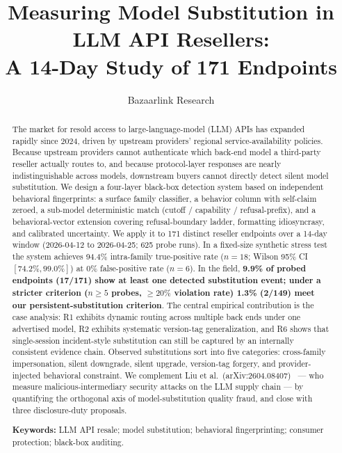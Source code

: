 \documentclass[10pt,a4paper,twocolumn]{article}
\title{Measuring Model Substitution in LLM API Resellers:\\
  A 14-Day Study of 171 Endpoints}
\author[1]{Bazaarlink Research}
\affil[1]{\texttt{bazaarlink.ai} --- corresponding repository:\\
  \href{https://github.com/Bazaarlinkorg/LLMprobe-engine}{github.com/Bazaarlinkorg/LLMprobe-engine}}
\date{}
\begin{document}
\maketitle

\begin{abstract}
The market for resold access to large-language-model (LLM) APIs has expanded
rapidly since 2024, driven by upstream providers' regional service-availability
policies. Because upstream providers cannot authenticate which back-end model a
third-party reseller actually routes to, and because protocol-layer responses
are nearly indistinguishable across models, downstream buyers cannot directly
detect silent model substitution. We design a four-layer black-box detection
system based on independent behavioral fingerprints: a surface family
classifier, a behavior column with self-claim zeroed, a sub-model deterministic
match (cutoff / capability / refusal-prefix), and a behavioral-vector extension
covering refusal-boundary ladder, formatting idiosyncrasy, and calibrated
uncertainty. We apply it to 171 distinct reseller endpoints over a 14-day
window (2026-04-12 to 2026-04-25; 625 probe runs). In a fixed-size
synthetic stress test the system achieves 94.4\% intra-family true-positive
rate ($n{=}18$; Wilson 95\% CI $[74.2\%, 99.0\%]$) at 0\% false-positive rate
($n{=}6$). In the field, \textbf{9.9\% of probed endpoints (17/171) show at
least one detected substitution event; under a stricter criterion ($n{\geq}5$
probes, ${\geq}20\%$ violation rate) 1.3\% (2/149) meet our
persistent-substitution criterion}. The central empirical contribution is the
case analysis: R1 exhibits dynamic routing across multiple back ends under one
advertised model, R2 exhibits systematic version-tag generalization, and R6
shows that single-session incident-style substitution can still be captured by
an internally consistent evidence chain. Observed substitutions sort into five
categories: cross-family impersonation, silent downgrade, silent upgrade,
version-tag forgery, and provider-injected behavioral constraint. We complement Liu et al.\
(arXiv:2604.08407)~\cite{liu2026agent} ---  who measure malicious-intermediary
security attacks on the LLM supply chain --- by quantifying the orthogonal axis
of model-substitution quality fraud, and close with three disclosure-duty
proposals.

\medskip
\noindent\textbf{Keywords:} LLM API resale; model substitution; behavioral
fingerprinting; consumer protection; black-box auditing.
\end{abstract}
\end{document}
